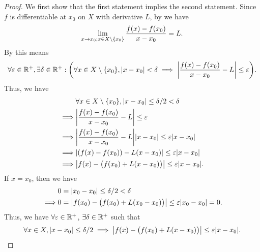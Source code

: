 \begin{proof}
  We first show that the first statement implies the second statement.
  Since \(f\) is differentiable at \(x_0\) on \(X\) with derivative \(L\), by  we have
  \[
    \lim_{x \to x_0 ; x \in X \setminus \left\lbrace x_0\right\rbrace} \dfrac{f(x) - f(x_0)}{x - x_0} = L.
  \]
  By  this means
  \[
    \forall \varepsilon \in \R^+, \exists \delta \in \R^+ : \bigg(\forall x \in X \setminus \set{x_0}, \abs{x - x_0} < \delta \implies \abs{\dfrac{f(x) - f(x_0)}{x - x_0} - L} \leq \varepsilon\bigg).
  \]
  Thus, we have
  \begin{align*}
             & \forall x \in X \setminus \set{x_0}, \abs{x - x_0} \leq \delta / 2 < \delta           \\
    \implies & \abs{\dfrac{f(x) - f(x_0)}{x - x_0} - L} \leq \varepsilon                             \\
    \implies & \abs{\dfrac{f(x) - f(x_0)}{x - x_0} - L} \abs{x - x_0} \leq \varepsilon \abs{x - x_0} \\
    \implies & \abs{(f(x) - f(x_0)) - L(x - x_0)} \leq \varepsilon \abs{x - x_0}                     \\
    \implies & \abs{f(x) - \big(f(x_0) + L(x - x_0)\big)} \leq \varepsilon \abs{x - x_0}.
  \end{align*}
  If \(x = x_0\), then we have
  \begin{align*}
             & 0 = \abs{x_0 - x_0} \leq \delta / 2 < \delta                                             \\
    \implies & 0 = \abs{f(x_0) - \big(f(x_0) + L(x_0 - x_0)\big)} \leq \varepsilon \abs{x_0 - x_0} = 0.
  \end{align*}
  Thus, we have \(\forall \varepsilon \in \mathbb{R}^+\), \(\exists \delta \in \mathbb{R}^+\) such that
  \[
    \forall x \in X, \abs{x - x_0} \leq \delta / 2 \implies \abs{f(x) - \big(f(x_0) + L(x - x_0)\big)} \leq \varepsilon \abs{x - x_0}.
  \]


\end{proof}
